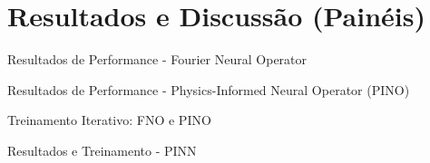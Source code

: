 \section{Resultados e Discussão (Painéis)}

\begin{frame}{Resultados de Performance - Fourier Neural Operator}

\end{frame}

\begin{frame}{Resultados de Performance - Physics-Informed Neural Operator (PINO)}

\end{frame}

\begin{frame}{Treinamento Iterativo: FNO e PINO}

\end{frame}

\begin{frame}{Resultados e Treinamento - PINN}

\end{frame}
